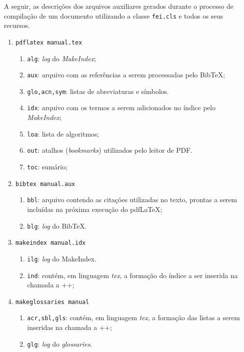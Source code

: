 \documentclass[xindy,rascunho]{fei}
\begin{document}
\begin{teorema}
	A seguir, as descrições dos arquivos auxiliares gerados durante o processo de compilação de um documento utilizando a classe \texttt{fei.cls} e todos os seus recursos.
		
	\begin{enumerate}
	
	\item\verb+pdflatex manual.tex+
	\begin{enumerate}
	\item \texttt{alg}: \emph{log} do \emph{MakeIndex};
	\item \texttt{aux}: arquivo com as referências a serem processadas pelo Bib\TeX;
	\item \texttt{glo,acn,sym}: listas de abreviaturas e símbolos.
	\item \texttt{idx}: arquivo com os termos a serem adicionados no índice pelo \emph{MakeIndex};
	\item \texttt{loa}: lista de algoritmos;
	\item \texttt{out}: atalhos (\emph{bookmarks}) utilizados pelo leitor de PDF.
	\item \texttt{toc}: sumário;
	\end{enumerate}	
	
	\item\verb+bibtex manual.aux+
	\begin{enumerate}
	\item \texttt{bbl}: arquivo contendo as citações utilizadas no texto, prontas a serem incluídas na próxima execução do pdf\LaTeX;
	\item \texttt{blg}: \emph{log} do Bib\TeX.
	\end{enumerate}	
	
	\item\verb+makeindex manual.idx+
	\begin{enumerate}
	\item \texttt{ilg}: \emph{log} do MakeIndex.
	\item \texttt{ind}: contém, em linguagem \emph{tex}, a formação do índice a ser inserida na chamada a \latexinline+\printindex+;
	\end{enumerate}	
	
	\item\verb+makeglossaries manual+
	\begin{enumerate}
	\item \texttt{acr,sbl,gls}:  contém, em linguagem \emph{tex}, a formação das listas a serem inseridas na chamada a \latexinline+\printglossaries+;
	\item \texttt{glg}: \emph{log} do \emph{glossaries}.
	\end{enumerate}
	\end{enumerate}
	

\end{teorema}
\end{document}
